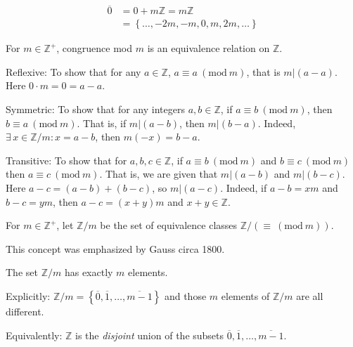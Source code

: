 \documentclass{notes}
\begin{document}
\begin{eg}
  \begin{align*}
    \overline 0 &= 0 + m \mathbb Z = m \mathbb Z \\ 
    &= \left \{ \dots, -2 m, -m, 0, m, 2 m, \dots \right \}
  \end{align*}
\end{eg}

\begin{prop}
  For $m \in \mathbb Z^+$, congruence mod $m$ is an equivalence relation on $\mathbb Z$.
\end{prop}

\begin{prf}
  Reflexive: To show that for any $a \in \mathbb Z$, $a \equiv a\ (\mathrm{mod}\ m)$, that is $m \vert (a - a)$.
  Here $0 \cdot m = 0 = a - a$.

  Symmetric: To show that for any integers $a, b \in \mathbb Z$, if $a \equiv b\ (\mathrm{mod}\ m)$, then $b \equiv a\ (\mathrm{mod}\ m)$.
  That is, if $m \vert (a - b)$, then $m \vert (b - a)$.
  Indeed, $\exists \, x \in \mathbb Z / m: x = a - b$, then $m (-x) = b - a$.

  Transitive: To show that for $a, b, c \in \mathbb Z$, if $a \equiv b\ (\mathrm{mod}\ m)$ and $b \equiv c\ (\mathrm{mod}\ m)$ then $a \equiv c\ (\mathrm{mod}\ m)$.
  That is, we are given that $m \vert (a - b)$ and $m \vert (b - c)$.
  Here $a - c = (a - b) + (b - c)$, so $m \vert (a - c)$.
  Indeed, if $a - b = x m$ and $b - c = y m$, then $a - c = (x + y) m$ and $x + y \in \mathbb Z$.
\end{prf}

\begin{defn}
  For $m \in \mathbb Z^+$, let $\mathbb Z / m$ be the set of equivalence classes $\mathbb Z / (\equiv\ (\mathrm{mod}\ m))$.

  This concept was emphasized by Gauss circa 1800.
\end{defn}

\begin{prop}
  The set $\mathbb Z / m$ has exactly $m$ elements.

  Explicitly: $\mathbb Z / m = \left \{ \overline 0, \overline 1, \dots, \overline{m - 1} \right \}$ and those $m$ elements of $\mathbb Z / m$ are all different.

  Equivalently: $\mathbb Z$ is the \textit{disjoint} union of the subsets $\overline 0, \overline 1, \dots, \overline{m - 1}$.
\end{prop}
\end{document}
